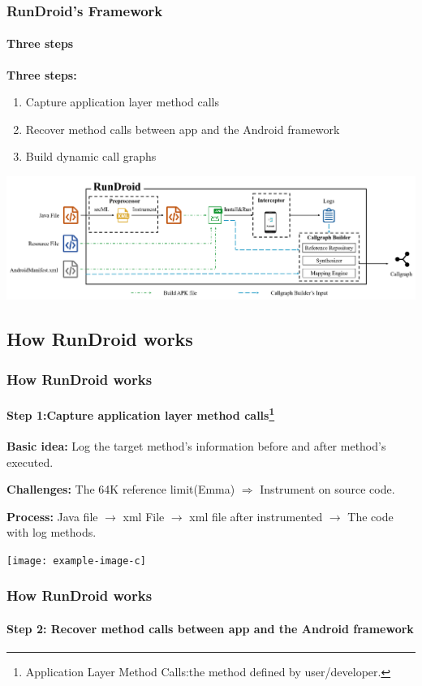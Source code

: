 \documentclass{beamer}
\begin{document}
\begin{frame}
\frametitle{RunDroid's Framework}
\framesubtitle{Three steps}
\textbf{Three steps:}

\begin{enumerate}
\item Capture application layer method calls
\item Recover method calls between app and the Android framework
\item Build dynamic call graphs\newline
\end{enumerate}
\includegraphics[keepaspectratio=true,width=1\linewidth]{Our-Approach.png}
\end{frame}
\subsection{How RunDroid works}
\begin{frame}
\frametitle{How RunDroid works}
\framesubtitle{Step 1:Capture application layer method calls\footnote{Application Layer Method Calls:the method defined by user/developer.}}

\textbf{Basic idea:}\newline
Log the target method's information before and after method's executed.

\textbf{Challenges:}\newline
The 64K reference limit(Emma) $\Longrightarrow$ Instrument on source code.

\textbf{Process:}\newline
Java file $\longrightarrow$ xml File $\longrightarrow$ xml file after instrumented $\longrightarrow$ The code with log methods.

\centering
\texttt{[image: example-image-c]}

\end{frame}

\begin{frame}
\frametitle{How RunDroid works}
\framesubtitle{Step 2: Recover method calls between app and the Android framework}
\end{frame}
\end{document}
